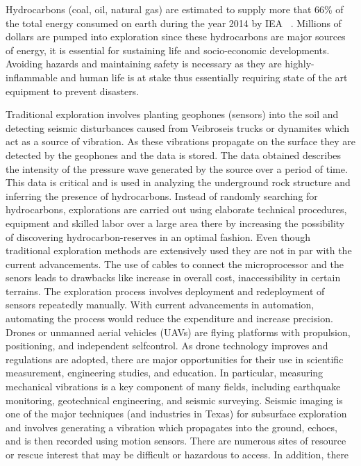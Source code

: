 \documentclass[conference]{IEEEtran}
\begin{document}
Hydrocarbons (coal, oil, natural gas) are estimated to
supply more that 66\% of the total energy consumed on earth
during the year 2014 by IEA ~\cite{bektas2006multiple}.
 Millions of dollars are pumped into exploration since these hydrocarbons are major sources of energy, it is essential for sustaining life and socio-economic developments. Avoiding hazards and maintaining safety is necessary as they are highly-inflammable and human life is at stake thus essentially requiring state of the art equipment to prevent disasters.

Traditional exploration involves planting geophones (sensors)
into the soil and detecting seismic disturbances caused
from Veibroseis trucks or dynamites which act as a source of
vibration. As these vibrations propagate on the surface they
are detected by the geophones and the data is stored. The
data obtained describes the intensity of the pressure wave
generated by the source over a period of time. This data
is critical and is used in analyzing the underground rock
structure and inferring the presence of hydrocarbons. Instead of randomly searching for hydrocarbons, explorations are carried out using elaborate technical procedures, equipment and skilled labor over a large area there by increasing the possibility of discovering hydrocarbon-reserves in an optimal fashion. 
Even though traditional exploration methods are extensively used they are not in par with the current advancements. The use of cables to connect the microprocessor and the senors leads to drawbacks like increase in overall cost, inaccessibility in certain terrains. The exploration process involves deployment and redeployment of sensors repeatedly manually. With current advancements in automation, automating the process would reduce the expenditure and increase precision.
Drones or unmanned aerial vehicles (UAVs) are flying
platforms with propulsion, positioning, and independent selfcontrol.
As drone technology improves and regulations are
adopted, there are major opportunities for their use in scientific
measurement, engineering studies, and education. In particular,
measuring mechanical vibrations is a key component of many
fields, including earthquake monitoring, geotechnical engineering,
and seismic surveying. Seismic imaging is one of the
major techniques (and industries in Texas) for subsurface exploration
and involves generating a vibration which propagates
into the ground, echoes, and is then recorded using motion
sensors. There are numerous sites of resource or rescue interest
that may be difficult or hazardous to access. In addition, there
\end{document}
